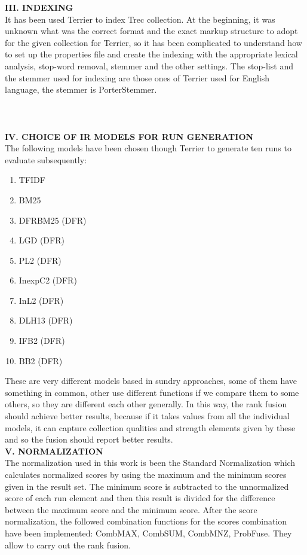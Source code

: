 \documentclass[12pt,journal]{IEEEtran}
\begin{document}
\textbf{III. INDEXING} \\
It has been used Terrier to index Trec collection. 
At the beginning, it was unknown what was the correct format and the exact markup structure to adopt for the given collection for Terrier, so it has been complicated to understand how to set up the properties file and create the indexing with the appropriate lexical analysis, stop-word removal, stemmer and the other settings. The stop-list and the stemmer used for indexing are those ones of Terrier used for English language, the stemmer is PorterStemmer. \\ \\ \\ \\

\textbf{IV. CHOICE OF IR MODELS FOR RUN GENERATION} \\
The following models have been chosen though Terrier to generate ten runs to evaluate subsequently: 
\begin{enumerate}
\item TFIDF
\item BM25
\item DFRBM25 (DFR)
\item LGD (DFR)
\item PL2 (DFR)
\item InexpC2 (DFR)
\item InL2 (DFR)
\item DLH13 (DFR)
\item IFB2 (DFR)
\item BB2 (DFR)
\end{enumerate} 
These are very different models based in sundry approaches, some of them have something in common, other use different functions if we compare them to some others, so they are different each other generally. In this way, the rank fusion should achieve better results, because if it takes values from all the individual models, it can capture collection qualities and strength elements given by these and so the fusion should report better results. \\

\textbf{V. NORMALIZATION} \\
The normalization used in this work is been the Standard Normalization which calculates normalized scores by using the maximum and the minimum scores given in the result set. 
The minimum score is subtracted to the unnormalized score of each run element and then this result is divided for the difference between the maximum score and the minimum score.
After the score normalization, the followed combination functions for the scores combination have been implemented: CombMAX, CombSUM, CombMNZ, ProbFuse.
They allow to carry out the rank fusion. \\
\end{document}
